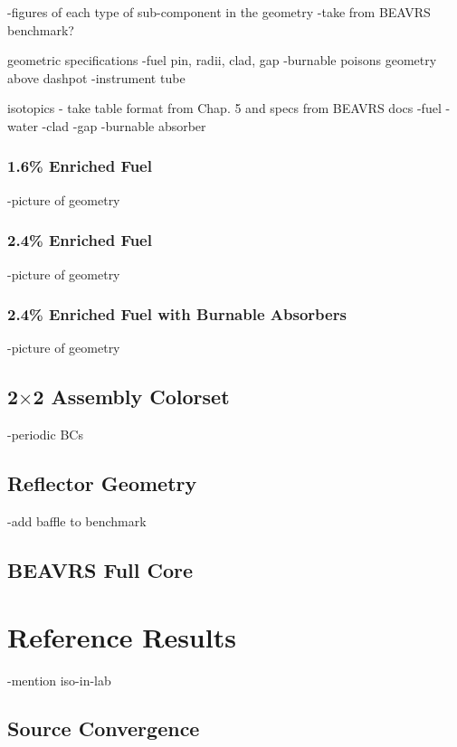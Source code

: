 -figures of each type of sub-component in the geometry
-take from BEAVRS benchmark?

geometric specifications
-fuel pin, radii, clad, gap
-burnable poisons geometry above dashpot
-instrument tube

isotopics - take table format from Chap. 5 and specs from BEAVRS docs
-fuel
-water
-clad
-gap
-burnable absorber

\subsubsection{1.6\% Enriched Fuel}

-picture of geometry

\subsubsection{2.4\% Enriched Fuel}

-picture of geometry

\subsubsection{2.4\% Enriched Fuel with Burnable Absorbers}

-picture of geometry

\subsection{2$\times$2 Assembly Colorset}

-periodic BCs

\subsection{Reflector Geometry}

-add baffle to benchmark

\subsection{BEAVRS Full Core}


\section{Reference Results}

-mention iso-in-lab

\subsection{Source Convergence}

